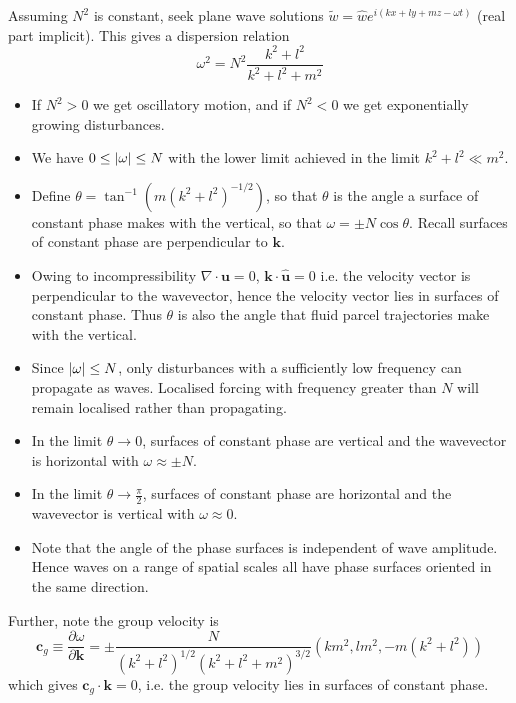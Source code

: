 \documentclass{jknotes}
\begin{document}
Assuming $N^2$ is constant, seek plane wave solutions $\tilde{w} =
\hat{w}e^{i(kx + ly + mz - \omega t)}$ (real part implicit). This gives a
dispersion relation
\begin{equation}
	\omega^2 = N^2 \frac{k^2 + l^2}{k^2 + l^2 + m^2}
\end{equation}

\begin{itemize}
	\item If $N^2 > 0$ we get oscillatory motion, and if $N^2 < 0$ we get
		exponentially growing disturbances.
	\item We have $0 \le \abs{\omega} \le N$ with the lower limit achieved in
		the limit $k^2 + l^2 \ll m^2$. 
	\item Define $\theta = \tan^{-1}(m(k^2+l^2)^{-1/2})$, so that $\theta$ is
		the angle a surface of constant phase makes with the vertical, so that
		$\omega = \pm N \cos \theta$. Recall
		surfaces of constant phase are perpendicular to $\symbf{k}$. 
	\item Owing to incompressibility $\nabla \cdot \symbf{u} = 0$, $\symbf{k}
		\cdot \hat{\symbf{u}} = 0$ i.e. the velocity vector is perpendicular
		to the wavevector, hence the velocity vector lies in surfaces of constant
		phase. Thus $\theta$ is also the angle that fluid parcel
		trajectories make with the vertical.
	\item Since $\abs{\omega} \le N$, only disturbances with a sufficiently
		low frequency can propagate as waves.  Localised forcing with
		frequency greater than $N$ will remain localised rather than
		propagating. 
	\item In the limit $\theta \to 0$, surfaces of constant phase are vertical
		and the wavevector is horizontal with $\omega \approx \pm N$.
	\item In the limit $\theta \to \frac{\pi}{2}$, surfaces of constant phase
		are horizontal and the wavevector is vertical with $\omega \approx 0$.
	\item Note that the angle of the phase surfaces is independent of wave
		amplitude. Hence waves on a range of spatial scales all have phase
		surfaces oriented in the same direction.
\end{itemize}  

Further, note the group velocity is
\begin{equation}
	\symbf{c}_g \equiv \frac{\partial \omega}{\partial \symbf{k}} = \pm
	\frac{N}{(k^2+l^2)^{1/2} (k^2+l^2+m^2)^{3/2}} (km^2, lm^2, -m(k^2+l^2))
\end{equation}
which gives $\symbf{c}_g \cdot \symbf{k} = 0$, i.e. the group velocity lies in
surfaces of constant phase.
\end{document}

